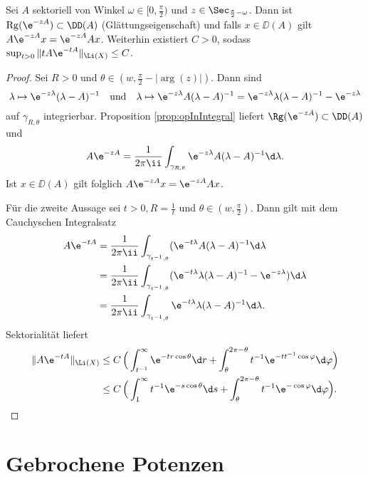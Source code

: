 \begin{thm}
  Sei $A$ sektoriell von Winkel $\omega \in [0,\frac{\pi}{2})$ und $z \in \Sec_{\frac{\pi}{2} - \omega}$.
    Dann ist $\operatorname{Rg}(\e^{-zA}) \subset \DD(A)$ (Glättungseigenschaft) und falls $x \in \DD(A)$ gilt $A \e^{-zA} x = \e^{-z A} A x$.
    Weiterhin existiert $C > 0$, sodass $\sup_{t > 0} \|t A \e^{-t A} \|_{\Li(X)} \leq C$.
\end{thm}

\begin{proof}
  Sei $R > 0$ und $\theta \in (w, \frac{\pi}{2} - |\arg(z)|)$.
  Dann sind
  $$
  \lambda \mapsto \e^{-z\lambda}(\lambda - A)^{-1} \quad\text{und}\quad \lambda \mapsto \e^{-z\lambda} A(\lambda - A)^{-1} = \e^{-z\lambda} \lambda (\lambda - A)^{-1} - \e^{-z\lambda} 
  $$
  auf $\gamma_{R,\theta}$ integrierbar.
  Proposition \ref{prop:opInIntegral} liefert $\Rg(\e^{-zA}) \subset \DD(A)$ und 
  $$
  A \e^{-zA} = \frac{1}{2\pi \ii} \int_{\gamma_{R,\theta}} \e^{-z\lambda} A(\lambda - A)^{-1} \d \lambda.
  $$
  Ist $x \in \DD(A)$ gilt folglich $A \e^{-zA} x = \e^{-z A} A x$.
  
  Für die zweite Aussage sei $t > 0,  R = \frac{1}{t}$ und $\theta \in (w, \frac{\pi}{2})$.
  Dann gilt mit dem Cauchyschen Integralsatz
  \begin{align*}
    A \e^{-tA}
    &= \frac{1}{2 \pi \ii} \int_{\gamma_{t^{-1},\theta}} (\e^{-t\lambda} A (\lambda - A)^{-1} \d \lambda \\
    &= \frac{1}{2 \pi \ii} \int_{\gamma_{t^{-1},\theta}} (\e^{-t\lambda} \lambda (\lambda - A)^{-1} - \e^{-z\lambda}) \d \lambda\\
    &= \frac{1}{2 \pi \ii} \int_{\gamma_{t^{-1},\theta}} \e^{-t\lambda} \lambda (\lambda - A)^{-1} \d \lambda.
  \end{align*}
  Sektorialität liefert
  \begin{align*}
    \| A \e^{-t A} \|_{\Li(X)}
    &\leq C\, \Big( \int_{t^{-1}}^\infty \e^{-tr \cos \theta} \d r + \int_\theta^{2\pi - \theta} t^{-1} \e^{-t t^{-1} \cos \varphi} \d \varphi\Big) \\
    &\leq C\, \Big( \int_1^\infty t^{-1} \e^{-s\cos \theta} \d s + \int_\theta^{2\pi - \theta} t^{-1} \e^{-\cos \varphi} \d \varphi \Big). \qedhere
  \end{align*}
\end{proof}

\section{Gebrochene Potenzen}

